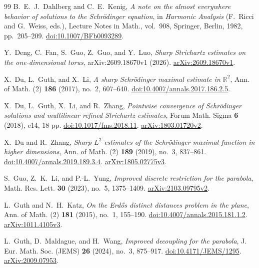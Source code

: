 \begin{thebibliography}{99}
B.~E.~J.~Dahlberg and C.~E.~Kenig,
\emph{A note on the almost everywhere behavior of solutions to the
Schr\"odinger equation},
in \emph{Harmonic Analysis}
(F.~Ricci and G.~Weiss, eds.),
Lecture Notes in Math., vol.~908,
Springer, Berlin, 1982, pp.~205--209.
\href{https://doi.org/10.1007/BFb0093289}{doi:10.1007/BFb0093289}.

Y.~Deng, C.~Fan, S.~Guo, Z.~Guo, and Y.~Luo,
\emph{Sharp Strichartz estimates on the one-dimensional torus},
arXiv:2609.18670v1 (2026).
\href{https://arxiv.org/abs/2609.18670v1}{arXiv:2609.18670v1}.

X.~Du, L.~Guth, and X.~Li,
\emph{A sharp Schr\"odinger maximal estimate in $\mathbb R^2$},
Ann. of Math. (2) \textbf{186} (2017), no.~2, 607--640.
\href{https://doi.org/10.4007/annals.2017.186.2.5}{doi:10.4007/annals.2017.186.2.5}.

X.~Du, L.~Guth, X.~Li, and R.~Zhang,
\emph{Pointwise convergence of Schr\"odinger solutions and multilinear refined
Strichartz estimates},
Forum Math. Sigma \textbf{6} (2018), e14, 18 pp.
\href{https://doi.org/10.1017/fms.2018.11}{doi:10.1017/fms.2018.11}.
\href{https://arxiv.org/abs/1803.01720v2}{arXiv:1803.01720v2}.

X.~Du and R.~Zhang,
\emph{Sharp $L^2$ estimates of the Schr\"odinger maximal function
in higher dimensions},
Ann. of Math. (2) \textbf{189} (2019), no.~3, 837--861.
\href{https://doi.org/10.4007/annals.2019.189.3.4}{doi:10.4007/annals.2019.189.3.4}.
\href{https://arxiv.org/abs/1805.02775v3}{arXiv:1805.02775v3}.

S.~Guo, Z.~K.~Li, and P.-L.~Yung,
\emph{Improved discrete restriction for the parabola},
Math. Res. Lett. \textbf{30} (2023), no.~5, 1375--1409.
\href{https://arxiv.org/abs/2103.09795v2}{arXiv:2103.09795v2}.

L.~Guth and N.~H.~Katz,
\emph{On the Erd\H{o}s distinct distances problem in the plane},
Ann. of Math. (2) \textbf{181} (2015), no.~1, 155--190.
\href{https://doi.org/10.4007/annals.2015.181.1.2}{doi:10.4007/annals.2015.181.1.2}.
\href{https://arxiv.org/abs/1011.4105v3}{arXiv:1011.4105v3}.

L.~Guth, D.~Maldague, and H.~Wang,
\emph{Improved decoupling for the parabola},
J. Eur. Math. Soc. (JEMS) \textbf{26} (2024), no.~3, 875--917.
\href{https://doi.org/10.4171/JEMS/1295}{doi:10.4171/JEMS/1295}.
\href{https://arxiv.org/abs/2009.07953}{arXiv:2009.07953}.


\end{thebibliography}
